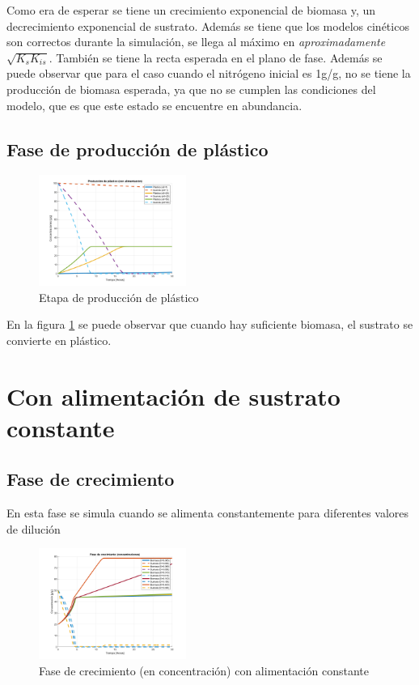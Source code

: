 \documentclass[letterpaper, 10 pt, conference]{ieeeconf}  %
\begin{document}
Como era de esperar se tiene un crecimiento exponencial de biomasa y, un decrecimiento exponencial de sustrato. Además se tiene que los modelos cinéticos son correctos durante la simulación, se llega al máximo en \textit{aproximadamente} $\sqrt{K_{s}K_{is}}$. También se tiene la recta esperada en el plano de fase. Además se puede observar que para el caso cuando el nitrógeno inicial es 1g/g, no se tiene la producción de biomasa esperada, ya que no se cumplen las condiciones del modelo, que es que este estado se encuentre en abundancia.

\subsection{Fase de producción de plástico}

\begin{figure}[H]
  \centering
  \includegraphics[width=0.43\textwidth]{./Images_tp1/D0_prod_completa.png}
  \caption{Etapa de producción de plástico}
  \label{fig:D0_prod_completa}
\end{figure}

En la figura \ref{fig:D0_prod_completa} se puede observar que cuando hay suficiente biomasa, el sustrato se convierte en plástico.

\section{Con alimentación de sustrato constante}

\subsection{Fase de crecimiento}

En esta fase se simula cuando se alimenta constantemente para diferentes valores de dilución

\begin{figure}[H]
  \centering
  \includegraphics[width=0.43\textwidth]{./Images_tp1/D1_growth_complete_concentration.png}
  \caption{Fase de crecimiento (en concentración) con alimentación constante}
\end{figure}
\end{document}
